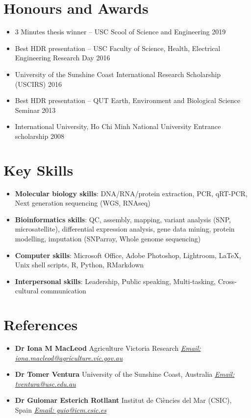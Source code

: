 \documentclass[letterpaper,11pt]{article}
\newcommand{\resumeItem}[2]{
  \item\small{
    \textbf{#1}{: #2 \vspace{0pt}}
  }
}
\newcommand{\resumeRef}[2]{
  \item\small{
    \textbf{#1} {#2}}
  }
\newcommand{\resumeBlack}[1]{\item\small{{#1}}}
\newcommand{\resumeSubItem}[2]{\resumeItem{#1}{#2}}
\newcommand{\resumeItemListStart}{\begin{itemize}}
\newcommand{\resumeItemListEnd}{\end{itemize}}
\begin{document}
\section{Honours and Awards}
\resumeItemListStart
	\resumeBlack{3 Minutes thesis winner – USC Scool of Science and Engineering 2019}
	\resumeBlack{Best HDR presentation – USC Faculty of Science, Health, Electrical Engineering Research Day 2016}
    \resumeBlack{University of the Sunshine Coast International Research Scholarship (USCIRS) 2016}
    \resumeBlack{Best HDR presentation –  QUT Earth, Environment and Biological Science Seminar 2013}
    \resumeBlack{International University, Ho Chi Minh National University Entrance scholarship 2008}
\resumeItemListEnd  

\section{Key Skills}
 \resumeItemListStart
    \resumeSubItem{Molecular biology skills}{DNA/RNA/protein extraction, PCR, qRT-PCR, Next generation sequencing (WGS, RNAseq)}
    \resumeSubItem{Bioinformatics skills}{QC, assembly, mapping, variant analysis (SNP, microsatellite), differential expression analysis, gene data mining, protein modelling, imputation (SNParray, Whole genome sequencing)}
    \resumeSubItem{Computer skills}{Microsoft Office, Adobe Photoshop, Lightroom, LaTeX, Unix shell scripts, R, Python, RMarkdown}
    \resumeSubItem{Interpersonal skills}{Leadership, Public speaking, Multi-tasking, Cross-cultural communication}
  \resumeItemListEnd

\section{References}
 \resumeItemListStart
    \resumeRef{Dr Iona M MacLeod}  {Agriculture Victoria Research} \href{mailto:iona.mcleod@agriculture.vic.gov.au}{\textit{Email: iona.macleod@agriculture.vic.gov.au}}
    \resumeRef{Dr Tomer Ventura}  {University of the Sunshine Coast, Australia} \href{mailto:tventura@usc.edu.au}{\textit{Email: tventura@usc.edu.au}} 
    \resumeRef{Dr Guiomar Esterich Rotllant}  {Institut de Ciències del Mar (CSIC), Spain} \href{mailto:guio@icm.csic.es}{\textit{Email: guio@icm.csic.es}} 
  \resumeItemListEnd
  
\end{document}
